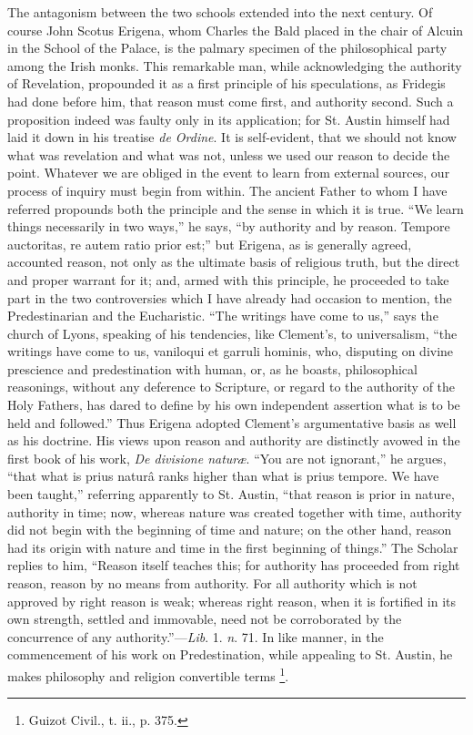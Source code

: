 The antagonism between the two schools extended into the next
century. Of course John Scotus Erigena, whom Charles the Bald placed
in the chair of Alcuin in the School of the Palace, is the palmary
specimen of the philosophical party among the Irish monks. This
remarkable man, while acknowledging the authority of Revelation,
propounded it as a first principle of his speculations, as Fridegis
had done before him, that reason must come first, and authority
second. Such a proposition indeed was faulty only in its application;
for St. Austin himself had laid it down in his treatise \emph{de Ordine}.
It is self-evident, that we should not know what was revelation and
what was not, unless we used our reason to decide the point. Whatever
we are obliged in the event to learn from external sources, our
process of inquiry must begin from within. The ancient Father to whom
I have referred propounds both the principle and the sense in which it
is true. ``We learn things necessarily in two ways,'' he says,
``by authority and by reason. Tempore auctoritas, re autem ratio
prior est;'' but Erigena, as is generally agreed, accounted
reason, not only as the ultimate basis of religious truth, but the
direct and proper warrant for it; and, armed with this principle, he
proceeded to take part in the two controversies which I have already
had occasion to mention, the Predestinarian and the Eucharistic.
``The writings have come to us,'' says the church of Lyons,
speaking of his tendencies, like Clement's, to universalism, ``the
writings have come to us, vaniloqui et garruli hominis, who, disputing
on divine prescience and predestination with human, or, as he
boasts, philosophical reasonings, without any deference to Scripture,
or regard to the authority of the Holy Fathers, has dared to define by
his own independent assertion what is to be held and followed.''
Thus Erigena adopted Clement's argumentative basis as well as his
doctrine. His views upon reason and authority are distinctly avowed in
the first book of his work, \emph{De divisione naturæ}. ``You are
not ignorant,'' he argues, ``that what is prius naturâ ranks
higher than what is prius tempore. We have been taught,''
referring apparently to St. Austin, ``that reason is prior in
nature, authority in time; now, whereas nature was created together
with time, authority did not begin with the beginning of time and
nature; on the other hand, reason had its origin with nature and time
in the first beginning of things.'' The Scholar replies to him,
``Reason itself teaches this; for authority has proceeded from
right reason, reason by no means from authority. For all authority
which is not approved by right reason is weak; whereas right reason,
when it is fortified in its own strength, settled and immovable, need
not be corroborated by the concurrence of any authority.''—\emph{Lib}.
1. \emph{n}. 71. In like manner, in the commencement of his work on
Predestination, while appealing to St. Austin, he makes philosophy and
religion convertible terms \footnote{Guizot
Civil., t. ii., p. 375.}.

